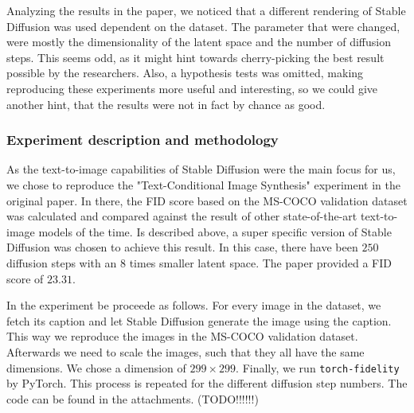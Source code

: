 \documentclass[11pt]{article}
\begin{document}
Analyzing the results in the paper, we noticed that a different rendering of Stable Diffusion was used dependent on the dataset. The parameter that were changed, were mostly the dimensionality of the latent space and the number of diffusion steps. This seems odd, as it might hint towards cherry-picking the best result possible by the researchers. Also, a hypothesis tests was omitted, making reproducing these experiments more useful and interesting, so we could give another hint, that the results were not in fact by chance as good.

\subsubsection{Experiment description and methodology}
As the text-to-image capabilities of Stable Diffusion were the main focus for us, we chose to reproduce the "Text-Conditional Image Synthesis" experiment in the original paper. In there, the FID score based on the MS-COCO validation dataset\cite{lin2015microsoftcococommonobjects} was calculated and compared against the result of other state-of-the-art text-to-image models of the time. Is described above, a super specific version of Stable Diffusion was chosen to achieve this result. In this case, there have been $250$ diffusion steps with an $8$ times smaller latent space. The paper provided a FID score of $23.31$.

In the experiment be proceede as follows. For every image in the dataset, we fetch its caption and let Stable Diffusion generate the image using the caption. This way we reproduce the images in the MS-COCO validation dataset. Afterwards we need to scale the images, such that they all have the same dimensions. We chose a dimension of $299\times299$. Finally, we run \texttt{torch-fidelity}\cite{obukhov2020torchfidelity} by PyTorch. This process is repeated for the different diffusion step numbers. The code can be found in the attachments. (TODO!!!!!!)
\end{document}
